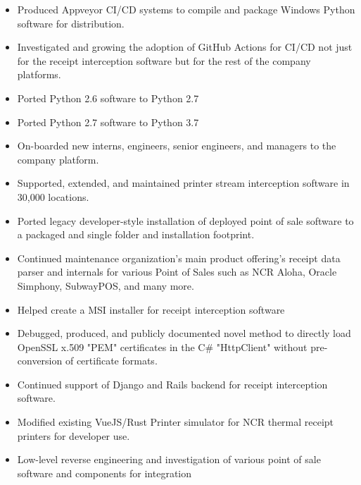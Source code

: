 \documentclass[10pt,letter,ragged2e]{altacv}
\begin{document}
\begin{paracol}{2}


\begin{itemize}
\item Produced Appveyor CI/CD systems to compile and package Windows Python software for distribution.
\item Investigated and growing the adoption of GitHub Actions for CI/CD not just for the receipt interception software but for the rest of the company platforms.
\item Ported Python 2.6 software to Python 2.7
\item Ported Python 2.7 software to Python 3.7
\item On-boarded new interns, engineers, senior engineers, and managers to the company platform.
\item Supported, extended, and maintained printer stream interception software in 30,000 locations.
\item Ported legacy developer-style installation of deployed point of sale software to a packaged and single folder and installation footprint.
\item Continued maintenance organization's main product offering's receipt data parser and internals for various Point of Sales such as NCR Aloha, Oracle Simphony, SubwayPOS, and many more.
\item Helped create a MSI installer for receipt interception software
\item Debugged, produced, and publicly documented novel method to directly load OpenSSL x.509 "PEM" certificates in the C# "HttpClient" without pre-conversion of certificate formats.
\item Continued support of Django and Rails backend for receipt interception software.
\item Modified existing VueJS/Rust Printer simulator for NCR thermal receipt printers for developer use.
\item Low-level reverse engineering and investigation of various point of sale software and components for integration
\end{itemize}

\divider



\end{paracol}
\end{document}
